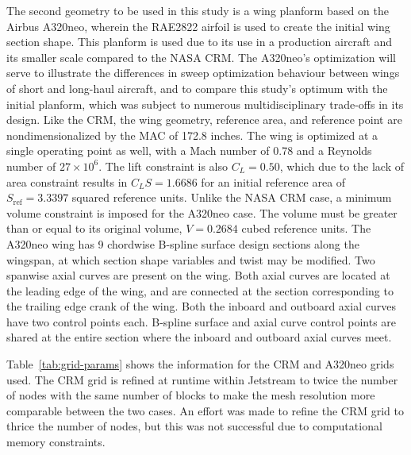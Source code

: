 The second geometry to be used in this study is a wing planform based on the Airbus A320neo, wherein the RAE2822 airfoil is used to create the initial wing section shape. This planform is used due to its use in a production aircraft and its smaller scale compared to the NASA CRM. The A320neo's optimization will serve to illustrate the differences in sweep optimization behaviour between wings of short and long-haul aircraft, and to compare this study's optimum with the initial planform, which was subject to numerous multidisciplinary trade-offs in its design. Like the CRM, the wing geometry, reference area, and reference point are nondimensionalized by the MAC of 172.8 inches. The wing is optimized at a single operating point as well, with a Mach number of 0.78 and a Reynolds number of $27\times10^6$. The lift constraint is also $C_L=0.50$, which due to the lack of area constraint results in $C_L S=1.6686$ for an initial reference area of $S_{\text{ref}}=3.3397$ squared reference units. Unlike the NASA CRM case, a minimum volume constraint is imposed for the A320neo case. The volume must be greater than or equal to its original volume, $V=0.2684$ cubed reference units. The A320neo wing has 9 chordwise B-spline surface design sections along the wingspan, at which section shape variables and twist may be modified. Two spanwise axial curves are present on the wing. Both axial curves are located at the leading edge of the wing, and are connected at the section corresponding to the trailing edge crank of the wing. Both the inboard and outboard axial curves have two control points each. B-spline surface and axial curve control points are shared at the entire section where the inboard and outboard axial curves meet.

Table~\ref{tab:grid-params} shows the information for the CRM and A320neo grids used. The CRM grid is refined at runtime within Jetstream to twice the number of nodes with the same number of blocks to make the mesh resolution more comparable between the two cases. An effort was made to refine the CRM grid to thrice the number of nodes, but this was not successful due to computational memory constraints.


